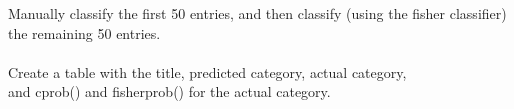 Manually classify the first 50 entries, and then classify (using
the fisher classifier) the remaining 50 entries. \\
\\
Create a table with the title, predicted category, actual category,\\
and cprob() and fisherprob() for the actual category.